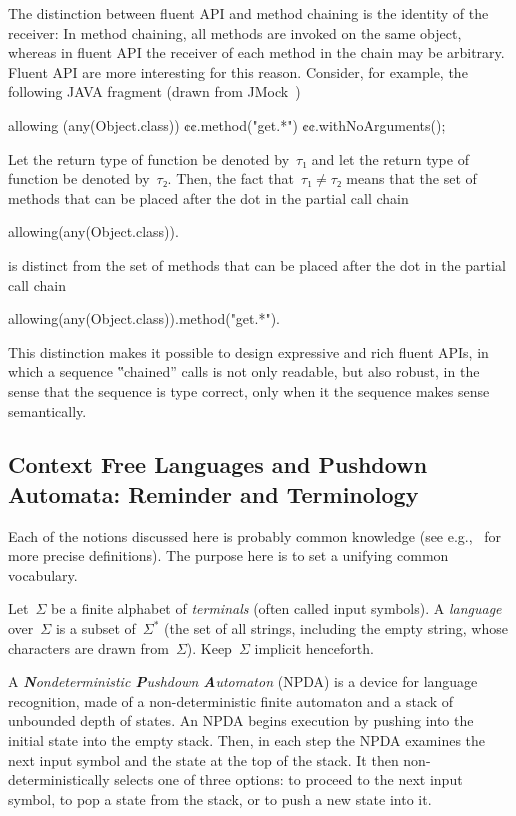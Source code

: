 The distinction between fluent API and method chaining is the identity of the receiver:
In method chaining, all methods are invoked on the same object, whereas in fluent API
  the receiver of each method in the chain may be arbitrary.
Fluent API are more interesting for this reason.
Consider, for example, the following JAVA fragment (drawn from JMock~\cite{Freeman:Pryce:06})
\begin{JAVA}
allowing (any(Object.class))
  ¢¢.method("get.*")
  ¢¢.withNoArguments();
\end{JAVA}
Let the return type of function  be denoted by~$τ₁$ and let the
  return type of function  be denoted by~$τ₂$.
Then, the fact that~$τ₁≠τ₂$ means that the set of methods that can be placed after the dot
  in the partial call chain
\begin{JAVA}
allowing(any(Object.class)).
\end{JAVA}
is distinct from the set of methods that can be placed after the dot in the partial call chain
\begin{JAVA}
allowing(any(Object.class)).method("get.*").
\end{JAVA}
This distinction makes it possible to design expressive and rich fluent APIs, in which a
  sequence ‟chained” calls is not only readable, but also robust, in the sense that the
  sequence is type correct, only when it the sequence makes sense semantically.

\subsection{Context Free Languages and Pushdown Automata: Reminder and Terminology}
Each of the notions discussed here is probably common knowledge
 (see e.g.,~\cite{Hopcroft:book:2001,must be others} for more precise definitions).
The purpose here is to set a unifying common vocabulary.

Let~$Σ$ be a finite alphabet of \emph{terminals} (often called input symbols).
A \emph{language} over~$Σ$
  is a subset of~$Σ^*$ (the set of all strings, including the empty string,
  whose characters are drawn from~$Σ$).
Keep~$Σ$ implicit henceforth.

A \emph{\textbf Nondeterministic \textbf Pushdown \textbf Automaton} (NPDA) is a device for language recognition,
  made of a non-deterministic finite automaton
  and a stack of unbounded depth of states.
An NPDA begins execution by pushing into the initial state into the empty stack.
Then, in each step the NPDA 
  examines the next input symbol and the state at the
  top of the stack.
It then non-deterministically selects one of three options: to proceed to the next input symbol,
  to pop a state from the stack, or to push a new state into it.

